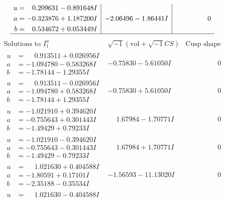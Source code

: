 \documentclass[1p]{elsarticle_modified}
\theoremstyle{definition}
\newcommand{\I}{\sqrt{-1}}
\begin{document}
$$\begin{array}{c|c|c}
\begin{aligned}
u &= \phantom{-}0.209631 - 0.891648 I \\
a &= -0.323876 + 1.187200 I \\
b &= \phantom{-}0.534672 + 0.053449 I\end{aligned}
 & -2.06496 - 1.86441 I & \phantom{-0.000000 } 0\\
 \hline 
 \end{array}$$\newpage$$\begin{array}{c|c|c}  
\text{Solutions to }I^u_{1}& \I (\text{vol} + \sqrt{-1}CS) & \text{Cusp shape}\\
 \hline 
\begin{aligned}
u &= \phantom{-}0.913511 + 0.026956 I \\
a &= -1.094780 - 0.583268 I \\
b &= -1.78144 - 1.29355 I\end{aligned}
 & -0.75830 - 5.61050 I & \phantom{-0.000000 } 0 \\ \hline\begin{aligned}
u &= \phantom{-}0.913511 - 0.026956 I \\
a &= -1.094780 + 0.583268 I \\
b &= -1.78144 + 1.29355 I\end{aligned}
 & -0.75830 + 5.61050 I & \phantom{-0.000000 } 0 \\ \hline\begin{aligned}
u &= -1.021910 + 0.394620 I \\
a &= -0.755643 + 0.301443 I \\
b &= -1.49429 + 0.79233 I\end{aligned}
 & \phantom{-}1.67984 - 1.70771 I & \phantom{-0.000000 } 0 \\ \hline\begin{aligned}
u &= -1.021910 - 0.394620 I \\
a &= -0.755643 - 0.301443 I \\
b &= -1.49429 - 0.79233 I\end{aligned}
 & \phantom{-}1.67984 + 1.70771 I & \phantom{-0.000000 } 0 \\ \hline\begin{aligned}
u &= \phantom{-}1.021630 + 0.404588 I \\
a &= -1.80591 + 0.17101 I \\
b &= -2.35188 - 0.35534 I\end{aligned}
 & -1.56593 - 11.13020 I & \phantom{-0.000000 } 0 \\ \hline\begin{aligned}
u &= \phantom{-}1.021630 - 0.404588 I \\

\end{aligned}
\end{array}$$
\end{document}
